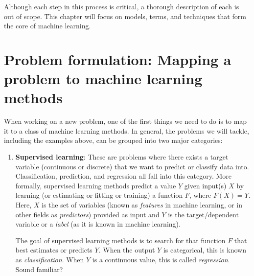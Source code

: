 \documentclass[]{krantz}
\begin{document}
Although each step in this process is critical, a thorough description
of each is out of scope. This chapter will focus on models, terms, and
techniques that form the core of machine learning.

\section{Problem formulation: Mapping a problem to machine learning
methods}\label{problem-formulation-mapping-a-problem-to-machine-learning-methods}

When working on a new problem, one of the first things we need to do is
to map it to a class of machine learning methods. In general, the
problems we will tackle, including the examples above, can be grouped
into two major categories:

\begin{enumerate}
\def\labelenumi{\arabic{enumi}.}
\item
  \textbf{Supervised learning}: These are problems where there exists a
  target variable (continuous or discrete) that we want to predict or
  classify data into. Classification, prediction, and regression all
  fall into this category. More formally, supervised learning methods
  predict a value \(Y\) given input(s) \(X\) by learning (or estimating
  or fitting or training) a function \(F\), where \(F(X) = Y\). Here,
  \(X\) is the set of variables (known as \emph{features} in machine
  learning, or in other fields as \emph{predictors}) provided as input
  and \(Y\) is the target/dependent variable or a \emph{label} (as it is
  known in machine learning).

  The goal of supervised learning methods is to search for that function
  \(F\) that best estimates or predicts \(Y\). When the output \(Y\) is
  categorical, this is known as \emph{classification}. When \(Y\) is a
  continuous value, this is called \emph{regression}. Sound familiar?


\end{enumerate}
\end{document}
